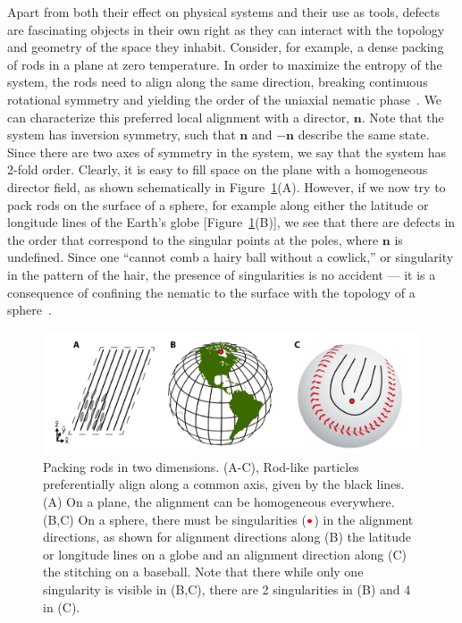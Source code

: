 Apart from both their effect on physical systems and their use as tools, defects are fascinating objects in their own right as they can interact with the topology and geometry of the space they inhabit.
Consider, for example, a dense packing of rods in a plane at zero temperature.
In order to maximize the entropy of the system, the rods need to align along the same direction, breaking continuous rotational symmetry and yielding the order of the uniaxial nematic phase~\cite{RN204}.
We can characterize this preferred local alignment with a director, $\mathbf{n}$.
Note that the system has inversion symmetry, such that $\mathbf{n}$ and $\mathbf{-n}$ describe the same state.
Since there are two axes of symmetry in the system, we say that the system has 2-fold order.
Clearly, it is easy to fill space on the plane with a homogeneous director field, as shown schematically in Figure~\ref{f:1-RodsPlane}(A).
However, if we now try to pack rods on the surface of a sphere, for example along either the latitude or longitude lines of the Earth's globe [Figure~\ref{f:1-RodsPlane}(B)], we see that there are defects in the order that correspond to the singular points at the poles, where $\mathbf{n}$ is undefined.
Since one ``cannot comb a hairy ball without a cowlick,'' or singularity in the pattern of the hair, the presence of singularities is no accident --- it is a consequence of confining the nematic to the surface with the topology of a sphere~\cite{RN209,RN169}.
\begin{figure}
  \centering
  \includegraphics{figures/C1/Ch1-Figs_RodsPlane.png}
  \caption{Packing rods in two dimensions.
  (A-C), Rod-like particles preferentially align along a common axis, given by the black lines.
  (A) On a plane, the alignment can be homogeneous everywhere.
  (B,C) On a sphere, there must be singularities (${\color{red} \bullet}$) in the alignment directions, as shown for alignment directions along (B) the latitude or longitude lines on a globe and an alignment direction along (C) the stitching on a baseball.
  Note that there while only one singularity is visible in (B,C), there are 2 singularities in (B) and 4 in (C).}\label{f:1-RodsPlane}
\end{figure}

